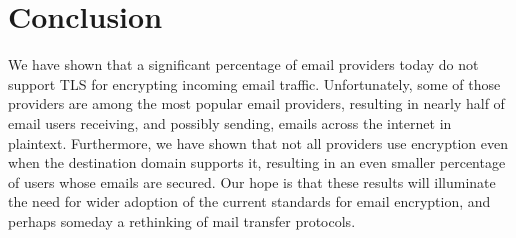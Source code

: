 \section{Conclusion}
We have shown that a significant percentage of email providers today do not support TLS for encrypting incoming email traffic.  Unfortunately, some of those providers are among the most popular email providers, resulting in nearly half of email users receiving, and possibly sending, emails across the internet in plaintext.  Furthermore, we have shown that not all providers use encryption even when the destination domain supports it, resulting in an even smaller percentage of users whose emails are secured.  Our hope is that these results will illuminate the need for wider adoption of the current standards for email encryption, and perhaps someday a rethinking of mail transfer protocols.
